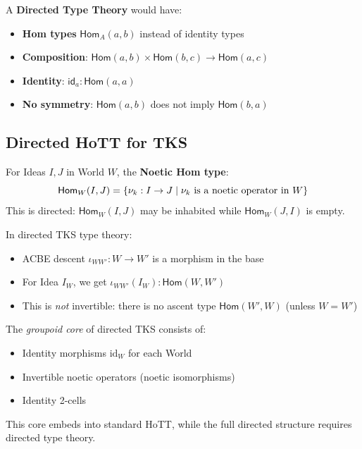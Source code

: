 \begin{definition}
\label{def:directed-tt}
A \textbf{Directed Type Theory} would have:
\begin{itemize}
  \item \textbf{Hom types} $\mathsf{Hom}_A(a, b)$ instead of identity types
  \item \textbf{Composition}: $\mathsf{Hom}(a,b) \times \mathsf{Hom}(b,c) \to \mathsf{Hom}(a,c)$
  \item \textbf{Identity}: $\mathsf{id}_a : \mathsf{Hom}(a, a)$
  \item \textbf{No symmetry}: $\mathsf{Hom}(a,b)$ does not imply $\mathsf{Hom}(b,a)$
\end{itemize}
\end{definition}

\subsection{Directed HoTT for TKS}
\label{subsec:directed-hott-tks}

\begin{definition}
\label{def:noetic-hom-type}
For Ideas $I, J$ in World $W$, the \textbf{Noetic Hom type}:
\[
  \mathsf{Hom}_W(I, J) = \{\nu_{k} : I \to J \mid \nu_{k} \text{ is a noetic operator in } W\}
\]
This is directed: $\mathsf{Hom}_W(I, J)$ may be inhabited while $\mathsf{Hom}_W(J, I)$ is empty.
\end{definition}

\begin{definition}
\label{def:acbe-directed-path}
In directed TKS type theory:
\begin{itemize}
  \item ACBE descent $\iota_{WW'} : W \to W'$ is a morphism in the base
  \item For Idea $I_W$, we get $\iota_{WW'}(I_W) : \mathsf{Hom}(W, W')$
  \item This is \emph{not} invertible: there is no ascent type $\mathsf{Hom}(W', W)$
        (unless $W = W'$)
\end{itemize}
\end{definition}

\begin{proposition}
\label{prop:groupoid-core}
The \emph{groupoid core} of directed TKS consists of:
\begin{itemize}
  \item Identity morphisms $\mathrm{id}_W$ for each World
  \item Invertible noetic operators (noetic isomorphisms)
  \item Identity 2-cells
\end{itemize}
This core embeds into standard HoTT, while the full directed structure requires
directed type theory.
\end{proposition}

